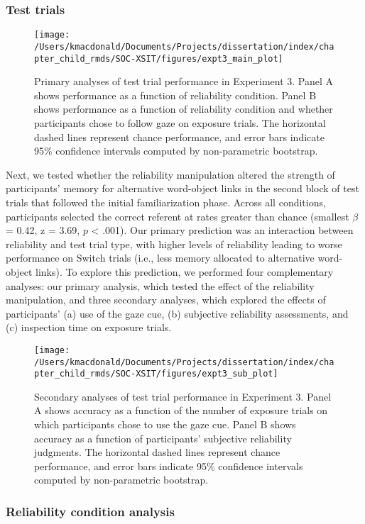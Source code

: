 \documentclass[oneside]{report}
\begin{document}
\hypertarget{test-trials-2}{%
\subsubsection{Test trials}\label{test-trials-2}}
\begin{figure}[t]

{\centering \texttt{[image: /Users/kmacdonald/Documents/Projects/dissertation/index/chapter\_child\_rmds/SOC-XSIT/figures/expt3\_main\_plot]} 

}

\caption[Primary analyses of test trial performance in Experiment 3.3]{Primary analyses of test trial performance in Experiment 3. Panel A shows performance as a function of reliability condition. Panel B shows performance as a function of reliability condition and whether participants chose to follow gaze on exposure trials. The horizontal dashed lines represent chance performance, and error bars indicate 95\% confidence intervals computed by non-parametric bootstrap.}\label{fig:e3-plot}
\end{figure}
Next, we tested whether the reliability manipulation altered the
strength of participants' memory for alternative word-object links in
the second block of test trials that followed the initial
familiarization phase. Across all conditions, participants selected the
correct referent at rates greater than chance (smallest \(\beta\) =
0.42, z = 3.69, \(p\) \textless{} .001). Our primary prediction was an
interaction between reliability and test trial type, with higher levels
of reliability leading to worse performance on Switch trials (i.e., less
memory allocated to alternative word-object links). To explore this
prediction, we performed four complementary analyses: our primary
analysis, which tested the effect of the reliability manipulation, and
three secondary analyses, which explored the effects of participants'
(a) use of the gaze cue, (b) subjective reliability assessments, and (c)
inspection time on exposure trials.
\begin{figure}[t]

{\centering \texttt{[image: /Users/kmacdonald/Documents/Projects/dissertation/index/chapter\_child\_rmds/SOC-XSIT/figures/expt3\_sub\_plot]} 

}

\caption[Secondary analyses of test trial performance in Experiment 3.3]{Secondary analyses of test trial performance in Experiment 3. Panel A shows accuracy as a function of the number of exposure trials on which participants chose to use the gaze cue. Panel B shows accuracy as a function of participants' subjective reliability judgments. The horizontal dashed lines represent chance performance, and error bars indicate 95\% confidence intervals computed by non-parametric bootstrap.}\label{fig:expt3-sub-plots}
\end{figure}
\hypertarget{reliability-condition-analysis}{%
\subsubsection{Reliability condition
analysis}\label{reliability-condition-analysis}}
\end{document}
